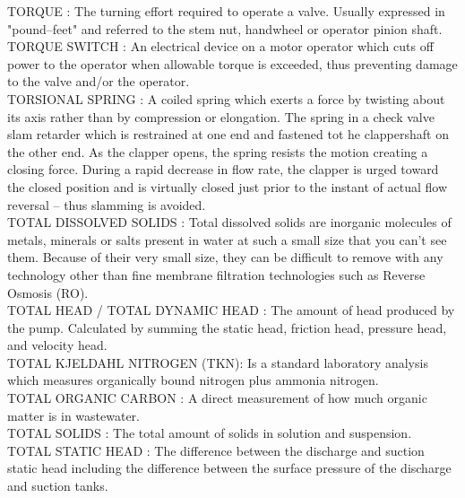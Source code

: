 TORQUE :   The turning effort required to operate a valve. Usually expressed in "pound–feet" and referred to the stem nut, handwheel or operator pinion shaft.\\
\vspace{0.15cm}
TORQUE SWITCH :   An electrical device on a motor operator which cuts off power to the operator when allowable torque is exceeded, thus preventing damage to the valve and/or the operator.\\
\vspace{0.15cm}
TORSIONAL SPRING :   A coiled spring which exerts a force by twisting about its axis rather than by compression or elongation. The spring in a check valve slam retarder which is restrained at one end and fastened tot he clappershaft on the other end. As the clapper opens, the spring resists the motion creating a closing force. During a rapid decrease in flow rate, the clapper is urged toward the closed position and is virtually closed just prior to the instant of actual flow reversal – thus slamming is avoided.\\
\vspace{0.15cm}
TOTAL DISSOLVED SOLIDS :   Total dissolved solids are inorganic molecules of metals, minerals or salts present in water at such a small size that you can’t see them. Because of their very small size, they can be difficult to remove with any technology other than fine membrane filtration technologies such as Reverse Osmosis (RO).\\
\vspace{0.15cm}
TOTAL HEAD / TOTAL DYNAMIC HEAD :   The amount of head produced by the pump. Calculated by summing the static head, friction head, pressure head, and velocity head.\\
\vspace{0.15cm}
TOTAL KJELDAHL NITROGEN (TKN): Is a standard laboratory analysis which measures organically bound nitrogen plus ammonia nitrogen.\\
\vspace{0.15cm}
TOTAL ORGANIC CARBON :   A direct measurement of how much organic matter is in wastewater.\\
\vspace{0.15cm}
TOTAL SOLIDS :   The total amount of solids in solution and suspension.\\
\vspace{0.15cm}
TOTAL STATIC HEAD :   The difference between the discharge and suction static head including the difference between the surface pressure of the discharge and suction tanks.\\
